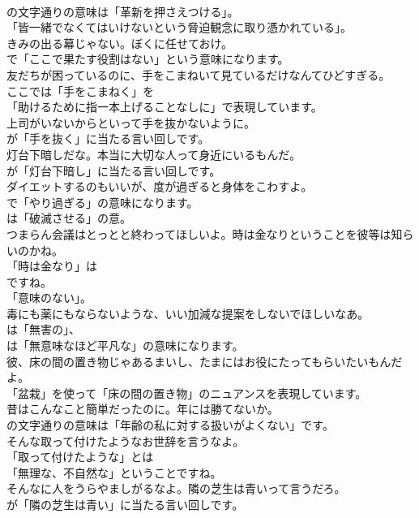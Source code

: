\documentclass[8pt]{extreport}
\begin{document}
\begin{CJK}{UTF8}{min}
\\	の文字通りの意味は「革新を押さえつける」。
\\	「皆一緒でなくてはいけないという脅迫観念に取り憑かれている」。	
\\	きみの出る幕じゃない。ぼくに任せておけ。 
\\	で「ここで果たす役割はない」という意味になります。	
\\	友だちが困っているのに、手をこまねいて見ているだけなんてひどすぎる。 
\\	ここでは「手をこまねく」を 
\\	「助けるために指一本上げることなしに」で表現しています。	
\\	上司がいないからといって手を抜かないように。 
\\	が「手を抜く」に当たる言い回しです。	
\\	灯台下暗しだな。本当に大切な人って身近にいるもんだ。 
\\	が「灯台下暗し」に当たる言い回しです。	
\\	ダイエットするのもいいが、度が過ぎると身体をこわすよ。 
\\	で「やり過ぎる」の意味になります。
\\	は「破滅させる」の意。	
\\	つまらん会議はとっとと終わってほしいよ。時は金なりということを彼等は知らいのかね。 
\\	「時は金なり」は
\\	ですね。
\\	「意味のない」。	
\\	毒にも薬にもならないような、いい加減な提案をしないでほしいなあ。 
\\	は「無害の」、
\\	は「無意味なほど平凡な」の意味になります。	
\\	彼、床の間の置き物じゃあるまいし、たまにはお役にたってもらいたいもんだよ。 
\\	「盆栽」を使って「床の間の置き物」のニュアンスを表現しています。	
\\	昔はこんなこと簡単だったのに。年には勝てないか。 
\\	の文字通りの意味は「年齢の私に対する扱いがよくない」です。	
\\	そんな取って付けたようなお世辞を言うなよ。 
\\	「取って付けたような」とは
\\	「無理な、不自然な」ということですね。	
\\	そんなに人をうらやましがるなよ。隣の芝生は青いって言うだろ。 
\\	が「隣の芝生は青い」に当たる言い回しです。	

\end{CJK}
\end{document}
